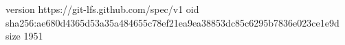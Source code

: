 version https://git-lfs.github.com/spec/v1
oid sha256:ae680d4365d53a35a484655c78ef21ea9ea38853dc85c6295b7836e023ce1e9d
size 1951
